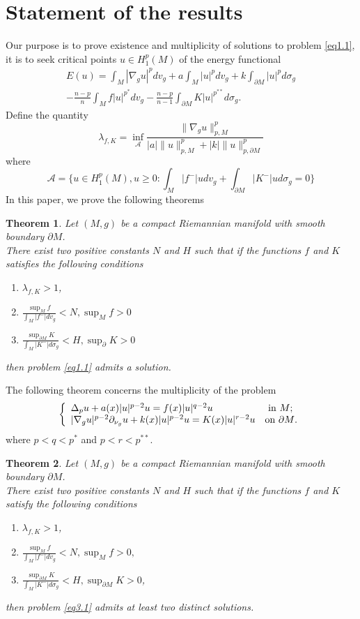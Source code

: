 \documentclass{Tran-l}
\newtheorem{thm}{Theorem}[section]
\theoremstyle{definition}
\theoremstyle{remark}
\numberwithin{equation}{section}
\begin{document}
\section{Statement of the results}
Our purpose is to prove existence and multiplicity of solutions to
problem \eqref{eq1.1}, it is to seek critical points $u\in
H^p_1(M)$ of the energy functional
\begin{eqnarray*}
&E(u)=\int_M|\nabla_gu|^{p}dv_g+a\int_M|u|^pdv_g+k\int_{\partial
M}|u|^pd\sigma_g&\\&-\frac{n-p}{n}\int_Mf|u|^{p^*}dv_g-\frac{n-p}{n-1}\int_{\partial
M}K|u|^{p^{**}}d\sigma_g.&
\end{eqnarray*}
 Define the quantity
\begin{equation*}
\lambda_{f,K}=\inf_{\mathcal{A}}\frac{\|\nabla_gu\|_{p,M}^p}
{|a|\|u\|_{p,M}^p+|k|\|u\|_{p,\partial M}^p}
\end{equation*}
where
\begin{equation*}
{\mathcal{A}}=\{u\in H_1^p(M),u\geq0: \int_M|f^-|udv_g+\int_{\partial
M}|K^-|ud\sigma_g=0\}
\end{equation*}
In this paper, we prove the following theorems
\begin{thm}\label{thm3.1}
Let $(M,g)$ be a compact Riemannian manifold with smooth boundary
$\partial M$.\\
There exist two positive constants $N$ and $H$ such that if the
functions $f$ and $K$ satisfies the following conditions
\begin{enumerate}
\item $\lambda_{f,K}>1$,
\item $\frac{\sup_Mf}{\int_{M}|f^-|dv_g}<N, \sup_Mf>0$
\item $\frac{\sup_{\partial M}K}{\int_{M}|K^-|d\sigma_g}<H, \sup_{\partial }K>0$
\end{enumerate}
then problem \eqref{eq1.1} admits a solution.
\end{thm}
The following theorem concerns the multiplicity of the problem
\begin{equation}\label{eq3.1}
    \left\{
       \begin{array}{ll}
         \Delta_pu+a(x)|u|^{p-2}u=f(x)|u|^{q-2}u & \hbox{ in $M$;}\\
         |\nabla_g u|^{p-2}\partial_{\nu_g}u+k(x)|u|^{p-2}u=K(x)|u|^{r-2}u &
 \hbox{on $\partial M$.}
       \end{array}
     \right.
\end{equation}
where $p<q<p^*$ and $p<r<p^{**}$.
\begin{thm}\label{thm3.2}
Let $(M,g)$ be a compact Riemannian manifold with smooth boundary
$\partial M$.\\ There exist two positive constants $N$ and $H$ such
that if the functions $f$ and $K$ satisfy the following conditions
\begin{enumerate}
\item $\lambda_{f,K}>1$,
\item $\frac{\sup_Mf}{\int_{M}|f^-|dv_g}<N,\sup_Mf>0, $
\item $\frac{\sup_{\partial
M}K}{\int_{M}|K^-|d\sigma_g}<H, \sup_{\partial M}K>0$,
\end{enumerate}
then problem \eqref{eq3.1} admits at least two distinct solutions.
\end{thm}
\end{document}
